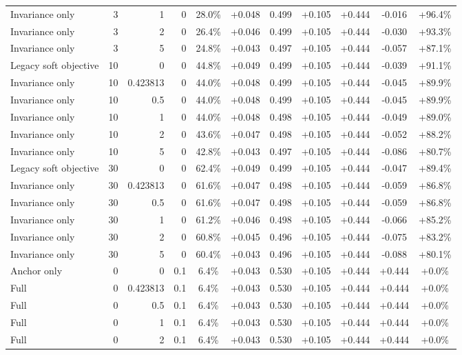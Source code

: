 \begin{table}[htbp]
\begin{tabular}{lrrrccccccc}
Invariance only & 3 & 1 & 0 & 28.0\% & +0.048 & 0.499 & +0.105 & +0.444 & -0.016 & +96.4\% \\
Invariance only & 3 & 2 & 0 & 26.4\% & +0.046 & 0.499 & +0.105 & +0.444 & -0.030 & +93.3\% \\
Invariance only & 3 & 5 & 0 & 24.8\% & +0.043 & 0.497 & +0.105 & +0.444 & -0.057 & +87.1\% \\
Legacy soft objective & 10 & 0 & 0 & 44.8\% & +0.049 & 0.499 & +0.105 & +0.444 & -0.039 & +91.1\% \\
Invariance only & 10 & 0.423813 & 0 & 44.0\% & +0.048 & 0.499 & +0.105 & +0.444 & -0.045 & +89.9\% \\
Invariance only & 10 & 0.5 & 0 & 44.0\% & +0.048 & 0.499 & +0.105 & +0.444 & -0.045 & +89.9\% \\
Invariance only & 10 & 1 & 0 & 44.0\% & +0.048 & 0.498 & +0.105 & +0.444 & -0.049 & +89.0\% \\
Invariance only & 10 & 2 & 0 & 43.6\% & +0.047 & 0.498 & +0.105 & +0.444 & -0.052 & +88.2\% \\
Invariance only & 10 & 5 & 0 & 42.8\% & +0.043 & 0.497 & +0.105 & +0.444 & -0.086 & +80.7\% \\
Legacy soft objective & 30 & 0 & 0 & 62.4\% & +0.049 & 0.499 & +0.105 & +0.444 & -0.047 & +89.4\% \\
Invariance only & 30 & 0.423813 & 0 & 61.6\% & +0.047 & 0.498 & +0.105 & +0.444 & -0.059 & +86.8\% \\
Invariance only & 30 & 0.5 & 0 & 61.6\% & +0.047 & 0.498 & +0.105 & +0.444 & -0.059 & +86.8\% \\
Invariance only & 30 & 1 & 0 & 61.2\% & +0.046 & 0.498 & +0.105 & +0.444 & -0.066 & +85.2\% \\
Invariance only & 30 & 2 & 0 & 60.8\% & +0.045 & 0.496 & +0.105 & +0.444 & -0.075 & +83.2\% \\
Invariance only & 30 & 5 & 0 & 60.4\% & +0.043 & 0.496 & +0.105 & +0.444 & -0.088 & +80.1\% \\
Anchor only & 0 & 0 & 0.1 & 6.4\% & +0.043 & 0.530 & +0.105 & +0.444 & +0.444 & +0.0\% \\
Full & 0 & 0.423813 & 0.1 & 6.4\% & +0.043 & 0.530 & +0.105 & +0.444 & +0.444 & +0.0\% \\
Full & 0 & 0.5 & 0.1 & 6.4\% & +0.043 & 0.530 & +0.105 & +0.444 & +0.444 & +0.0\% \\
Full & 0 & 1 & 0.1 & 6.4\% & +0.043 & 0.530 & +0.105 & +0.444 & +0.444 & +0.0\% \\
Full & 0 & 2 & 0.1 & 6.4\% & +0.043 & 0.530 & +0.105 & +0.444 & +0.444 & +0.0\% \\

\end{tabular}
\end{table}

